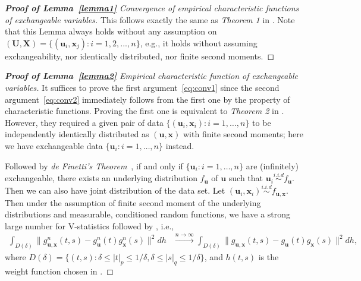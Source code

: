 \documentclass[11pt]{article}
\theoremstyle{definition}
\begin{document}
	\begin{proof}[\textbf{Proof of Lemma~\ref{lemma1}} Convergence of empirical characteristic functions of exchangeable variables] 
		This follows exactly the same as \textit{Theorem 1} in \cite{szekely2007measuring}. Note that this Lemma always holds without any assumption on $(\mathbf{U}, \mathbf{X} ) =  \{(\mathbf{u}_{i},\mathbf{x}_{j}) :  i=1,2,...,n\}$, e.g., it holds without assuming exchangeability, nor identically distributed, nor finite second moments.
	\end{proof}
	
	\begin{proof}[\textbf{Proof of Lemma~\ref{lemma2}} Empirical characteristic function of exchangeable variables] 
		\bigskip	
		It suffices to prove the first argument~\ref{eq:conv1} since the second argument~\ref{eq:conv2} immediately follows from the first one by the property of characteristic functions.
		Proving the first one is equivalent to \textit{Theorem 2} in \cite{szekely2007measuring}. However, they required a given pair of data $\{(\mathbf{u}_{i},\mathbf{x}_{i}) : i = 1, \ldots , n \}$ to be independently identically distributed as $(\mathbf{u},\mathbf{x})$ with finite second moments; here we have exchangeable data $\{  \mathbf{u}_{i} : i = 1, \ldots, n  \}$ instead. 
		
		Followed by \textit{de Finetti's Theorem}~\cite{diaconis1980finite}, if and only if $\{ \mathbf{u}_{i} : i = 1, \ldots, n \}$ are (infinitely) exchangeable, there exists an underlying distribution $f_{\mathbf{u}}$ of $\mathbf{u}$ such that $\mathbf{u}_{i}  \overset{i.i.d}{\sim} f_{\mathbf{u}} $. Then we can also have joint distribution of the data set. Let $(\mathbf{u}_{i}, \mathbf{x}_{i}) \overset{i.i.d}{\sim}   f_{\mathbf{u}, \mathbf{x}}$. Then under the assumption of finite second moment of the underlying distributions and measurable, conditioned random functions, we have a strong large number for V-statistics followed by \cite{szekely2007measuring}, i.e., 
		\begin{eqnarray}
		\displaystyle\int_{D(\delta)}{\|g_{\mathbf{u},\mathbf{x}}^{n}(t,s)-g_{\mathbf{u}}^{n}(t)g_{\mathbf{x}}^{n}(s)\|^{2}}dh &\stackrel{n \rightarrow \infty}{\longrightarrow} 
		\displaystyle\int_{D(\delta)}{\|g_{\mathbf{u},\mathbf{x}}(t,s)-g_{\mathbf{u}}(t)g_{\mathbf{x}}(s)\|^{2}}dh,
		\label{eq:SLLN}
		\end{eqnarray}
		where $D(\delta)=\{(t,s):\delta \leq |t|_{p} \leq 1/\delta,\delta \leq |s|_{q} \leq 1/\delta\}$, and $h(t,s)$ is the weight function chosen in \cite{szekely2007measuring}. 
	\end{proof}
	
\end{document}
